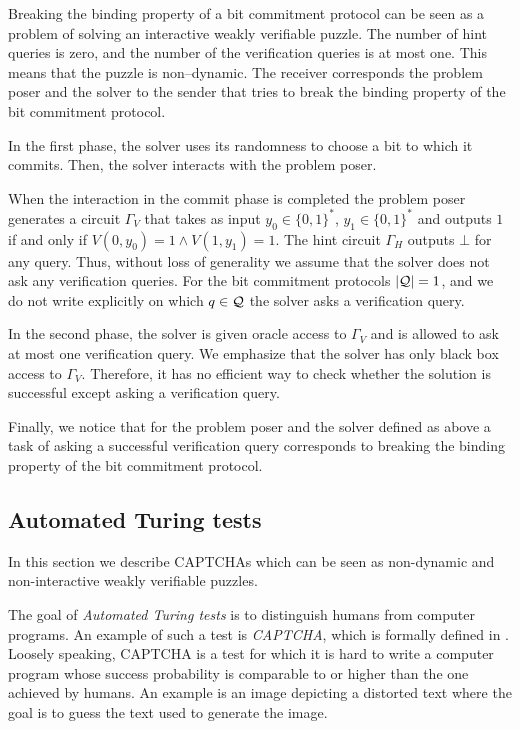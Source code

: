 Breaking the binding property of a bit commitment protocol can be seen as a problem of solving
an interactive weakly verifiable puzzle. The number of hint queries is zero, and the number of the verification queries is at most one.
This means that the puzzle is non--dynamic.
The receiver corresponds the problem poser and the solver to the sender that tries to break the binding property of the bit commitment protocol.

In the first phase, the solver uses its randomness to choose a bit to which it commits. Then, the solver interacts with the problem poser.

When the interaction in the commit phase is completed the problem poser generates a circuit $\Gamma_V$
that takes as input $y_0 \in \{0,1\}^{*}$, $y_1 \in \{0,1\}^{*}$ and outputs $1$
if and only if $V(0,y_0) = 1 \land V(1,y_1) = 1$. The hint circuit $\Gamma_H$ outputs $\bot$ for any query.
Thus, without loss of generality we assume that the solver does not ask any verification queries.
For the bit commitment protocols $|\mathcal{Q}| = 1$, and we do not write explicitly on which $q \in \mathcal{Q}$ the solver asks a verification query.

In the second phase, the solver is given oracle access to $\Gamma_V$ and is allowed to ask at most one verification query.
We emphasize that the solver has only black box access to $\Gamma_V$. Therefore, it has no efficient way to check whether
the solution is successful except asking a verification query.

Finally, we notice that for the problem poser and the solver defined as above a task of asking a successful verification query
corresponds to breaking the binding property of the bit commitment protocol.

\subsection{Automated Turing tests}
In this section we describe CAPTCHAs which can be seen as non-dynamic
and non-interactive weakly verifiable puzzles.

The goal of \textit{Automated Turing tests} is to distinguish humans from computer programs.
An example of such a test is \textit{CAPTCHA}, which is formally defined in \cite{von2003captcha}.
Loosely speaking, CAPTCHA is a test for which it is hard to write a computer program whose success
probability is comparable to or higher than the one achieved by humans. An example is an image
depicting a distorted text where the goal is to guess the text used to generate the image.

